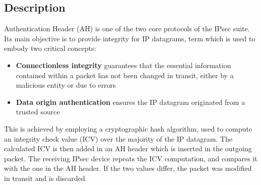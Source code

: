 \documentclass[a4paper,12pt]{report}
\begin{document}
		\subsection{Description}
		Authentication Header (AH) is one of the two core protocols of the IPsec suite. Its main objective is to provide integrity for IP datagrams, term which is used to embody two critical concepts:
		\begin{itemize}
			\item \textbf{Connectionless integrity} guarantees that the essential information contained within a packet has not been changed in transit, either by a malicious entity or due to errors
			\item \textbf{Data origin authentication} ensures the IP datagram originated from a trusted source
		\end{itemize}
		
		This is achieved by employing a cryptographic hash algorithm, used to compute an integrity check value (ICV) over the majority of the IP datagram. The calculated ICV is then added in an AH header which is inserted in the outgoing packet. The receiving IPsec device repeats the ICV computation, and compares it with the one in the AH header. If the two values differ, the packet was modified in transit and is discarded.
		
\end{document}
